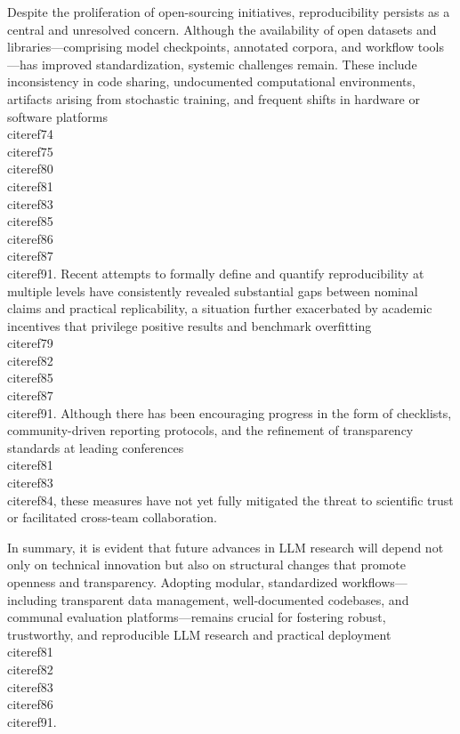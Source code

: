 \documentclass[11pt]{article}
\begin{document}
Despite the proliferation of open-sourcing initiatives, reproducibility persists as a central and unresolved concern. Although the availability of open datasets and libraries—comprising model checkpoints, annotated corpora, and workflow tools—has improved standardization, systemic challenges remain. These include inconsistency in code sharing, undocumented computational environments, artifacts arising from stochastic training, and frequent shifts in hardware or software platforms~\\cite{ref74}\\cite{ref75}\\cite{ref80}\\cite{ref81}\\cite{ref83}\\cite{ref85}\\cite{ref86}\\cite{ref87}\\cite{ref91}. Recent attempts to formally define and quantify reproducibility at multiple levels have consistently revealed substantial gaps between nominal claims and practical replicability, a situation further exacerbated by academic incentives that privilege positive results and benchmark overfitting~\\cite{ref79}\\cite{ref82}\\cite{ref85}\\cite{ref87}\\cite{ref91}. Although there has been encouraging progress in the form of checklists, community-driven reporting protocols, and the refinement of transparency standards at leading conferences~\\cite{ref81}\\cite{ref83}\\cite{ref84}, these measures have not yet fully mitigated the threat to scientific trust or facilitated cross-team collaboration.

In summary, it is evident that future advances in LLM research will depend not only on technical innovation but also on structural changes that promote openness and transparency. Adopting modular, standardized workflows—including transparent data management, well-documented codebases, and communal evaluation platforms—remains crucial for fostering robust, trustworthy, and reproducible LLM research and practical deployment~\\cite{ref81}\\cite{ref82}\\cite{ref83}\\cite{ref86}\\cite{ref91}.
\end{document}

